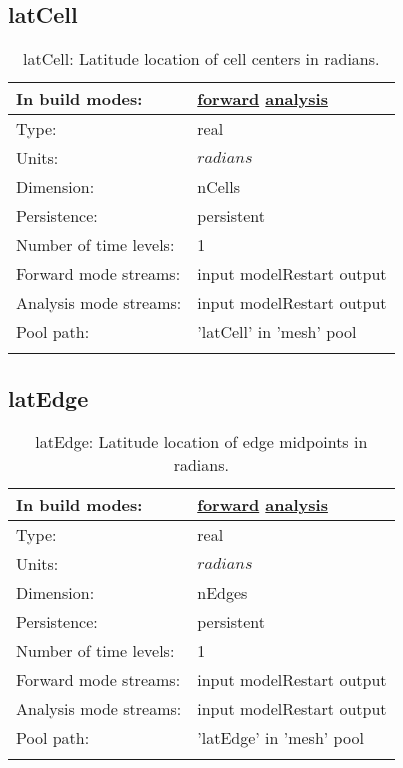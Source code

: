 \subsection[latCell]{latCell}
\label{subsec:var_sec_mesh_latCell}
\begin{center}
\begin{longtable}{| p{2.0in} | p{4.0in} |}
        \hline 
        In build modes: & \hyperref[subsec:forward_var_tab_mesh]{forward} \hyperref[subsec:analysis_var_tab_mesh]{analysis} \\
        \hline 
        Type: & real \\
        \hline 
        Units: & $radians$ \\
        \hline 
        Dimension: & nCells \\
        \hline 
        Persistence: & persistent \\
        \hline 
        Number of time levels: & 1 \\
        \hline 
		 Forward mode streams: &  input modelRestart output \\
        \hline 
		 Analysis mode streams: &  input modelRestart output \\
        \hline 
            Pool path: & 'latCell' in 'mesh' pool
 \\
		 \hline 
    \caption{latCell: Latitude location of cell centers in radians.}
\end{longtable}
\end{center}
\subsection[latEdge]{latEdge}
\label{subsec:var_sec_mesh_latEdge}
\begin{center}
\begin{longtable}{| p{2.0in} | p{4.0in} |}
        \hline 
        In build modes: & \hyperref[subsec:forward_var_tab_mesh]{forward} \hyperref[subsec:analysis_var_tab_mesh]{analysis} \\
        \hline 
        Type: & real \\
        \hline 
        Units: & $radians$ \\
        \hline 
        Dimension: & nEdges \\
        \hline 
        Persistence: & persistent \\
        \hline 
        Number of time levels: & 1 \\
        \hline 
		 Forward mode streams: &  input modelRestart output \\
        \hline 
		 Analysis mode streams: &  input modelRestart output \\
        \hline 
            Pool path: & 'latEdge' in 'mesh' pool
 \\
		 \hline 
    \caption{latEdge: Latitude location of edge midpoints in radians.}
\end{longtable}
\end{center}

